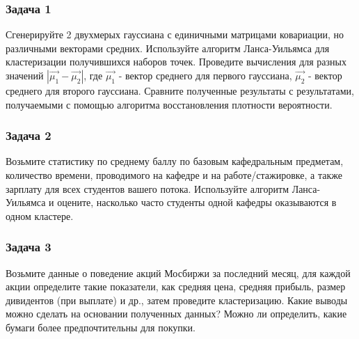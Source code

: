 \subsubsection*{Задача 1} 
Сгенерируйте 2 двухмерых гауссиана с единичными матрицами ковариации, но различными векторами средних. Используйте алгоритм Ланса-Уильямса для кластеризации получившихся наборов точек. Проведите вычисления для разных значений $|\Vec{\mu_1} - \Vec{\mu_2}|$, где $\Vec{\mu_1}$ - вектор среднего для первого гауссиана, $\Vec{\mu_2}$ - вектор среднего для второго гауссиана. Сравните полученные результаты с результатами, получаемыми с помощью алгоритма восстановления плотности вероятности. 

\subsubsection*{Задача 2} 
Возьмите статистику по среднему баллу по базовым кафедральным предметам, количество времени, проводимого на кафедре и на работе/стажировке, а также зарплату для всех студентов вашего потока. Используйте алгоритм Ланса-Уильямса и оцените, насколько часто студенты одной кафедры оказываются в одном кластере. 

\subsubsection*{Задача 3} 
Возьмите данные о поведение акций Мосбиржи за последний месяц, для каждой акции определите такие показатели, как средняя цена, средняя прибыль, размер дивидентов (при выплате) и др., затем проведите кластеризацию. Какие выводы можно сделать на основании полученных данных? Можно ли определить, какие бумаги более предпочтительны для покупки.


